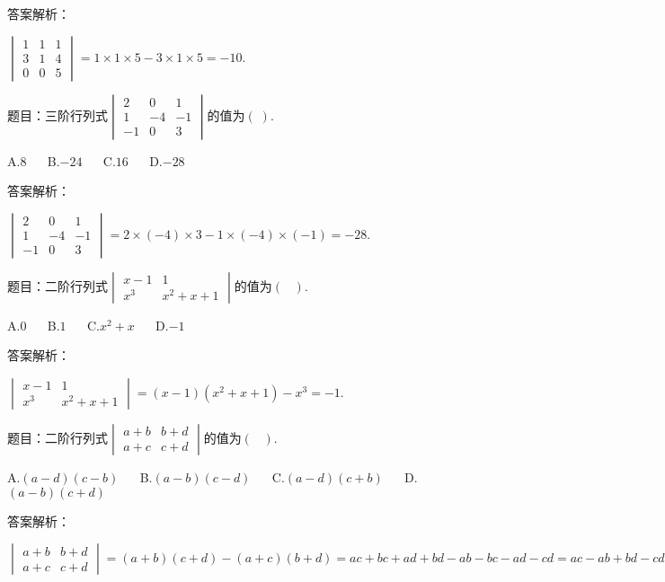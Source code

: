 答案解析：

$\begin{vmatrix}1&1&1\\3&1&4\\0&0&5\end{vmatrix}=1\times1\times5-3\times1\times5=-10.$



题目：$\mathrm{三阶行列式}\begin{vmatrix}2&0&1\\1&-4&-1\\-1&0&3\end{vmatrix}\mathrm{的值为}(\;).$

A.$8$ $\quad$ B.$-24$ $\quad$ C.$16$ $\quad$ D.$-28$

答案解析：

$\begin{vmatrix}2&0&1\\1&-4&-1\\-1&0&3\end{vmatrix}=2\times(-4)\times3-1\times(-4)\times(-1)=-28.$



题目：$\mathrm{二阶行列式}\begin{vmatrix}x-1&1\\x^3&x^2+x+1\end{vmatrix}\mathrm{的值为}(\;\;\;).$

A.$0$ $\quad$ B.$1$ $\quad$ C.$x^2+x$ $\quad$ D.$-1$

答案解析：

$\begin{vmatrix}x-1&1\\x^3&x^2+x+1\end{vmatrix}=(x-1)(x^2+x+1)-x^3=-1.$



题目：$\mathrm{二阶行列式}\begin{vmatrix}a+b&b+d\\a+c&c+d\end{vmatrix}\mathrm{的值为}(\;\;\;).$

A.$(a-d)(c-b)$ $\quad$ B.$(a-b)(c-d)$ $\quad$ C.$(a-d)(c+b)$ $\quad$ D.$(a-b)(c+d)$

答案解析：

$\begin{vmatrix}a+b&b+d\\a+c&c+d\end{vmatrix}=(a+b)(c+d)-(a+c)(b+d)=ac+bc+ad+bd-ab-bc-ad-cd=ac-ab+bd-cd=a(c-b)-d(c-b)=(a-d)(c-b).$



